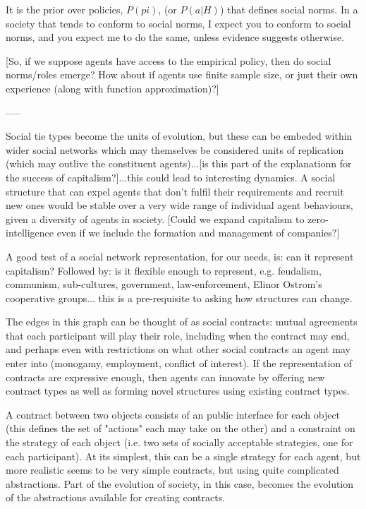 \documentclass[a4paper]{article}
\begin{document}
It is the prior over policies, $P(pi)$, (or $P(a|H)$) that defines social norms. In a society that tends to conform to social norms, I expect you to conform to social norms, and you expect me to do the same, unless evidence suggests otherwise.

[So, if we suppose agents have access to the empirical policy, then do social norms/roles emerge? How about if agents use finite sample size, or just their own experience (along with function approximation)?]

-----

 Social tie types become the units of evolution, but these can be embeded within wider social networks which may themselves be considered units of replication (which may outlive the constituent agents)...[is this part of the explanationn for the success of capitalism?]...this could lead to interesting dynamics. A social structure that can expel agents that don't fulfil their requirements and recruit new ones would be stable over a very wide range of individual agent behaviours, given a diversity of agents in society. [Could we expand capitalism to zero-intelligence even if we include the formation and management of companies?]

A good test of a social network representation, for our needs, is: can it represent capitalism? Followed by: is it flexible enough to represent, e.g. feudalism, communism, sub-cultures, government, law-enforcement, Elinor Ostrom's cooperative groups... this is a pre-requisite to asking how structures can change.  

The edges in this graph can be thought of as social contracts: mutual agreements that each participant will play their role, including when the contract may end, and perhaps even with restrictions on what other social contracts an agent may enter into (monogamy, employment, conflict of interest). If the representation of contracts are expressive enough, then agents can innovate by offering new contract types as well as forming novel structures using existing contract types. 

A contract between two objects consists of an public interface for each object (this defines the set of "actions" each may take on the other) and a constraint on the strategy of each object (i.e. two sets of socially acceptable strategies, one for each participant). At its simplest, this can be a single strategy for each agent, but more realistic seems to be very simple contracts, but using quite complicated abstractions. Part of the evolution of society, in this case, becomes the evolution of the abstractions available for creating contracts.
\end{document}
